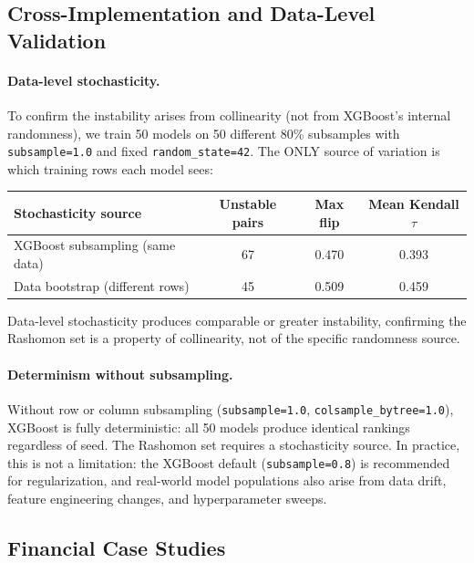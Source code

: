 \documentclass{article}
\begin{document}
\subsection{Cross-Implementation and Data-Level Validation}
\label{sec:mechanism-isolation}

\paragraph{Data-level stochasticity.}
To confirm the instability arises from collinearity (not from XGBoost's internal randomness), we train 50 models on 50 different 80\% subsamples with \texttt{subsample=1.0} and fixed \texttt{random\_state=42}. The ONLY source of variation is which training rows each model sees:

\begin{center}
\small
\begin{tabular}{@{}lccc@{}}
\toprule
Stochasticity source & Unstable pairs & Max flip & Mean Kendall $\tau$ \\
\midrule
XGBoost subsampling (same data) & 67 & 0.470 & 0.393 \\
Data bootstrap (different rows) & 45 & 0.509 & 0.459 \\
\bottomrule
\end{tabular}
\end{center}

Data-level stochasticity produces comparable or greater instability, confirming the Rashomon set is a property of collinearity, not of the specific randomness source.

\paragraph{Determinism without subsampling.}
\begin{sloppypar}
Without row or column subsampling (\texttt{subsample=1.0},
\texttt{colsample\_bytree=1.0}), XGBoost is fully deterministic: all 50 models
produce identical rankings regardless of seed. The Rashomon set requires a
stochasticity source. In practice, this is not a limitation: the XGBoost default
(\texttt{subsample=0.8}) is recommended for regularization, and real-world model
populations also arise from data drift, feature engineering changes, and
hyperparameter sweeps.
\end{sloppypar}

\subsection{Financial Case Studies}
\end{document}
